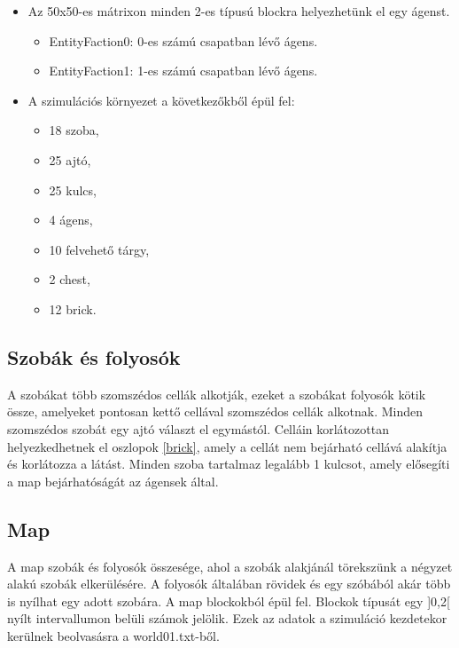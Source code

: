 \begin{itemize}
\begin{itemize}
    \end{itemize}

    \item Az 50x50-es mátrixon minden 2-es típusú blockra helyezhetünk el egy ágenst.
    
    \begin{itemize}
        \item EntityFaction0: 0-es számú csapatban lévő ágens.
        \item EntityFaction1: 1-es számú csapatban lévő ágens.
    \end{itemize}
    
    \item A szimulációs környezet a következőkből épül fel:
    
    \begin{itemize}
        \item 18 szoba, 
        \item 25 ajtó,
        \item 25 kulcs,
        \item 4 ágens,
        \item 10 felvehető tárgy,
        \item 2 chest,
        \item 12 brick.
    \end{itemize}

\end{itemize}

\subsection{Szobák és folyosók}

A szobákat több szomszédos cellák alkotják, ezeket a szobákat folyosók kötik össze, amelyeket pontosan kettő cellával szomszédos cellák alkotnak.
Minden szomszédos szobát egy ajtó választ el egymástól.
Celláin korlátozottan helyezkedhetnek el oszlopok \ref{brick}, amely a cellát nem bejárható cellává alakítja és korlátozza a látást.
Minden szoba tartalmaz legalább 1 kulcsot, amely elősegíti a map bejárhatóságát az ágensek által.

\subsection{Map}

A map szobák és folyosók összesége, ahol a szobák alakjánál törekszünk a négyzet alakú szobák elkerülésére. A folyosók általában rövidek és egy szóbából akár több is nyílhat egy adott szobára.
A map blockokból épül fel. Blockok típusát egy ]0,2[ nyílt intervallumon belüli számok jelölik.
Ezek az adatok a szimuláció kezdetekor kerülnek beolvasásra a world01.txt-ből.

